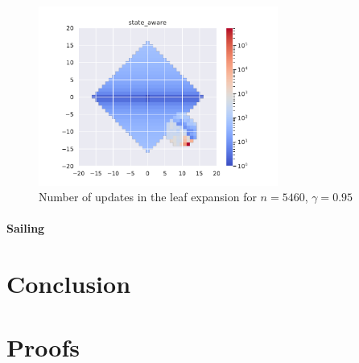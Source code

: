 \documentclass[runningheads]{llncs}
\begin{document}
\begin{figure}[H]
    \centering
    \includegraphics[width=0.7\textwidth]{img/4_updates_state_aware.pdf}
    \caption{Number of updates in the leaf expansion for $n = 5460$, $\gamma=0.95$}
    \label{fig:gw4_updates}
\end{figure}

\paragraph{Sailing}

\section*{Conclusion}





\clearpage
\appendix

\section{Proofs}
\end{document}
